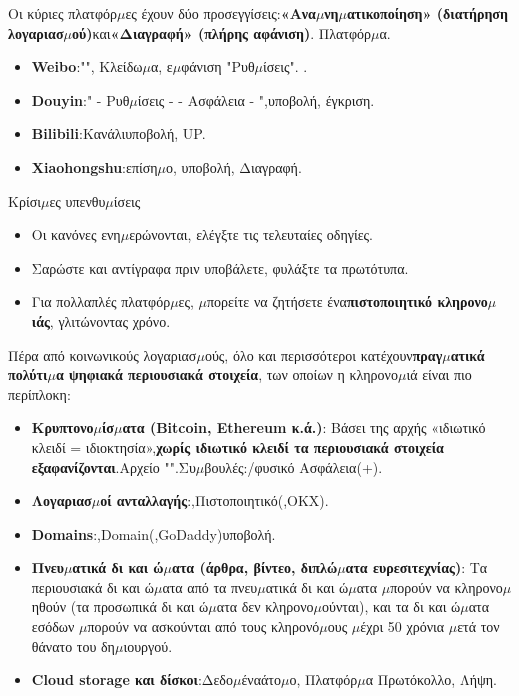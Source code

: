 
Οι κύριες πλατφόρ$\mu$ες έχουν δύο προσεγγίσεις:\textbf{«Ανα$\mu$νη$\mu$ατικοποίηση» (διατήρηση λογαριασ$\mu$ού)}και\textbf{«Διαγραφή» (πλήρης αφάνιση)}. Πλατφόρ$\mu$α.

\begin{itemize}
  \item \textbf{Weibo}:"", Κλείδω$\mu$α, ε$\mu$φάνιση "Ρυθ$\mu$ίσεις". .
  \item \textbf{Douyin}:" - Ρυθ$\mu$ίσεις - - Ασφάλεια - ",υποβολή, έγκριση.
  \item \textbf{Bilibili}:Κανάλιυποβολή, UP.
  \item \textbf{Xiaohongshu}:επίση$\mu$ο, υποβολή, Διαγραφή.
\end{itemize}

\begin{tcbinfo}{Κρίσι$\mu$ες υπενθυ$\mu$ίσεις}
\begin{itemize}
  \item Οι κανόνες ενη$\mu$ερώνονται, ελέγξτε τις τελευταίες οδηγίες.
  \item Σαρώστε και αντίγραφα πριν υποβάλετε, φυλάξτε τα πρωτότυπα.
  \item Για πολλαπλές πλατφόρ$\mu$ες, $\mu$πορείτε να ζητήσετε ένα\textbf{πιστοποιητικό κληρονο$\mu$ιάς}, γλιτώνοντας χρόνο.
\end{itemize}

\end{tcbinfo}


Πέρα από κοινωνικούς λογαριασ$\mu$ούς, όλο και περισσότεροι κατέχουν\textbf{πραγ$\mu$ατικά πολύτι$\mu$α ψηφιακά περιουσιακά στοιχεία}, των οποίων η κληρονο$\mu$ιά είναι πιο περίπλοκη:

\begin{itemize}
  \item \textbf{Κρυπτονο$\mu$ίσ$\mu$ατα (Bitcoin, Ethereum κ.ά.)}: Βάσει της αρχής «ιδιωτικό κλειδί = ιδιοκτησία»,\textbf{χωρίς ιδιωτικό κλειδί τα περιουσιακά στοιχεία εξαφανίζονται}.Αρχείο "".Συ$\mu$βουλές:/φυσικό Ασφάλεια(+).
  \item \textbf{Λογαριασ$\mu$οί ανταλλαγής}:,Πιστοποιητικό(,OKX).
  \item \textbf{Domains}:,Domain(,GoDaddy)υποβολή.
  \item \textbf{Πνευ$\mu$ατικά δι και ώ$\mu$ατα (άρθρα, βίντεο, διπλώ$\mu$ατα ευρεσιτεχνίας)}: Τα περιουσιακά δι και ώ$\mu$ατα από τα πνευ$\mu$ατικά δι και ώ$\mu$ατα $\mu$πορούν να κληρονο$\mu$ηθούν (τα προσωπικά δι και ώ$\mu$ατα δεν κληρονο$\mu$ούνται), και τα δι και ώ$\mu$ατα εσόδων $\mu$πορούν να ασκούνται από τους κληρονό$\mu$ους $\mu$έχρι 50 χρόνια $\mu$ετά τον θάνατο του δη$\mu$ιουργού.
  \item \textbf{Cloud storage και δίσκοι}:Δεδο$\mu$έναάτο$\mu$ο, Πλατφόρ$\mu$α Πρωτόκολλο, Λήψη.
\end{itemize}

